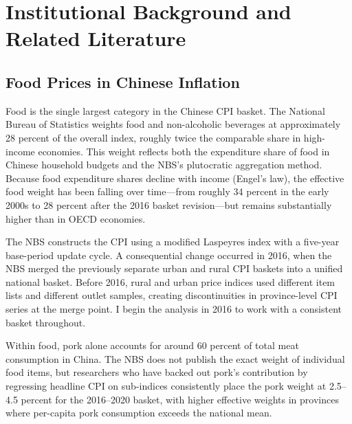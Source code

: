 
\section{Institutional Background and Related Literature}%
\label{sec:background}

\subsection{Food Prices in Chinese Inflation}\label{sec:food_cpi}

Food is the single largest category in the Chinese CPI basket.
The National Bureau of Statistics weights food and non-alcoholic
beverages at approximately 28 percent of the overall index,
roughly twice the comparable share in high-income economies.
This weight reflects both the expenditure share of food in
Chinese household budgets and the NBS's plutocratic aggregation
method.
Because food expenditure shares decline with income (Engel's
law), the effective food weight has been falling over time---from
roughly 34 percent in the early 2000s to 28 percent after the
2016 basket revision---but remains substantially higher than
in OECD economies.

The NBS constructs the CPI using a modified Laspeyres index
with a five-year base-period update cycle.
A consequential change occurred in 2016, when the NBS merged
the previously separate urban and rural CPI baskets into a
unified national basket.
Before 2016, rural and urban price indices used different
item lists and different outlet samples, creating
discontinuities in province-level CPI series at the merge
point.
I begin the analysis in 2016 to work with a consistent
basket throughout.

Within food, pork alone accounts for around 60 percent of total
meat consumption in China.
The NBS does not publish the exact weight of individual food
items, but researchers who have backed out pork's contribution
by regressing headline CPI on sub-indices consistently place the
pork weight at 2.5--4.5 percent for the 2016--2020 basket, with
higher effective weights in provinces where per-capita pork
consumption exceeds the national mean.

